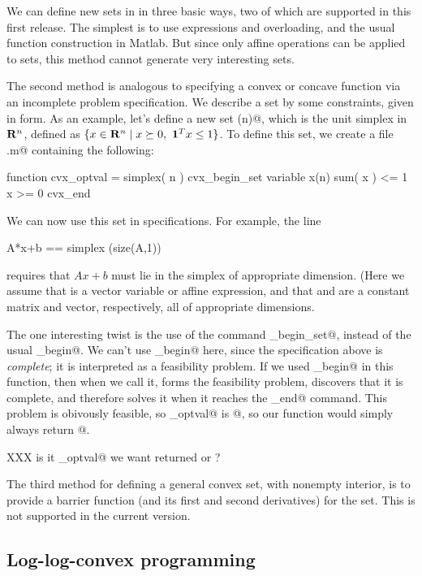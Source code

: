 \documentclass[12pt]{article}
\newcommand{\ones}{\mathbf 1}
\begin{document}
We can define new sets in \cvx in three basic ways, two of which
are supported in this first release.
The simplest is to use expressions and overloading, and the usual
function construction in Matlab.  But since only affine operations
can be applied to sets, this method cannot generate very 
interesting sets. 

The second method is analogous to specifying a convex or concave
function via an incomplete \cvx problem specification.
We describe a set by some constraints, given in \cvx form.
As an example, let's define a new set \verb@simplex(n)@, which is the
unit simplex in $\R^n$, defined as $\{x \in \R^n \;|\; 
x \succeq 0,~\ones^T x\leq 1 \}$.
To define this set, we create a file \verb@simplex.m@ containing
the following:
\begin{code}
function cvx_optval = simplex( n )
cvx_begin_set
variable x(n)
sum( x ) <= 1
x >= 0
cvx_end
\end{code}
We can now use this set in \cvx specifications.  For example, 
the line
\begin{code}
	A*x+b == simplex (size(A,1)) 
\end{code}
requires that $Ax+b$ must lie in the simplex of appropriate
dimension.
(Here we assume that \verb@x@ is a vector variable or affine
expression, and that \verb@A@ and \verb@b@ are a constant
matrix and vector, respectively, all of appropriate dimensions.

The one interesting twist is the use of the command 
\verb@cvx_begin_set@, instead of the usual \verb@cvx_begin@.
We can't use \verb@cvx_begin@ here, since the \cvx specification
above is \emph{complete}; it is interpreted as a feasibility problem.
If we used \verb@cvx_begin@ in this function, then when we call it,
\cvx forms the feasibility problem, discovers that it is complete,
and therefore solves it when it reaches the \verb@cvx_end@ command.
This problem is obivously feasible, so \verb@cvx_optval@ is @,
so our function would simply always return @.

XXX is it \verb@cvx_optval@ we want returned or \verb@x@?

The third method for defining a general convex set, with nonempty
interior, is to provide a barrier function (and its first and 
second derivatives) for the set.
This is not supported in the current version.
\fi

\iffalse
\subsection{Log-log-convex programming}
\end{document}
